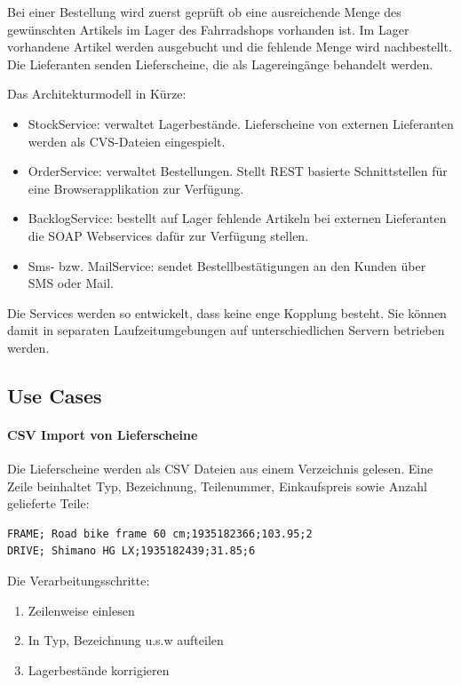 \documentclass[12pt,a4paper,ngerman]{article}
\begin{document}
Bei einer Bestellung wird zuerst geprüft ob eine ausreichende Menge des
gewünschten Artikels im Lager des Fahrradshops vorhanden ist. Im Lager
vorhandene Artikel werden ausgebucht und die fehlende Menge wird
nachbestellt. Die Lieferanten senden Lieferscheine, die als
Lagereingänge behandelt werden.

Das Architekturmodell in Kürze:

\begin{itemize}
\item
  StockService: verwaltet Lagerbestände. Lieferscheine von externen
  Lieferanten werden als CVS-Dateien eingespielt.
\item
  OrderService: verwaltet Bestellungen. Stellt REST basierte
  Schnittstellen für eine Browserapplikation zur Verfügung.
\item
  BacklogService: bestellt auf Lager fehlende Artikeln bei externen
  Lieferanten die SOAP Webservices dafür zur Verfügung stellen.
\item
  Sms- bzw. MailService: sendet Bestellbestätigungen an den Kunden über
  SMS oder Mail.
\end{itemize}

Die Services werden so entwickelt, dass keine enge Kopplung besteht. Sie
können damit in separaten Laufzeitumgebungen auf unterschiedlichen
Servern betrieben werden.

\subsection{Use Cases}

\paragraph{CSV Import von Lieferscheine}

Die Lieferscheine werden als CSV Dateien aus einem Verzeichnis gelesen.
Eine Zeile beinhaltet Typ, Bezeichnung, Teilenummer, Einkaufspreis sowie
Anzahl gelieferte Teile:

\begin{lstlisting}
FRAME; Road bike frame 60 cm;1935182366;103.95;2
DRIVE; Shimano HG LX;1935182439;31.85;6
\end{lstlisting}

Die Verarbeitungsschritte:

\begin{enumerate}[1.]
\item
  Zeilenweise einlesen
\item
  In Typ, Bezeichnung u.s.w aufteilen
\item
  Lagerbestände korrigieren
\end{enumerate}
\end{document}
